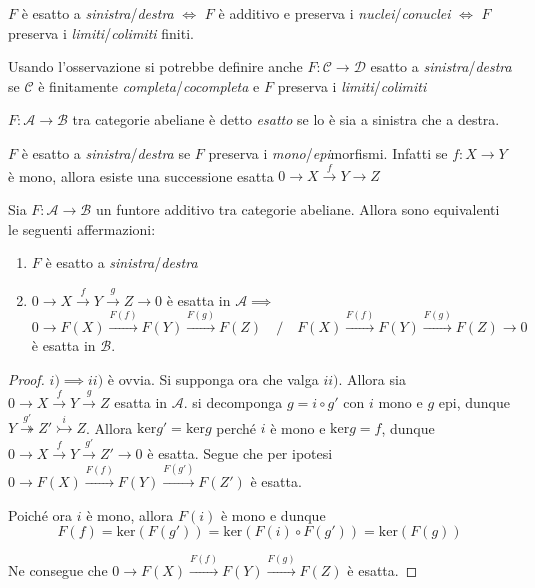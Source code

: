 \begin{remark}{}
    \(F\) è esatto a \emph{sinistra}/\emph{destra} \(\iff\) \(F\) è additivo
    e preserva i \emph{nuclei}/\emph{conuclei} \(\iff\) \(F\) preserva i
    \emph{limiti}/\emph{colimiti} finiti.
\end{remark}

Usando l'osservazione si potrebbe definire anche \(F : \mathcal{C} \to \mathcal{D}\)
esatto a \emph{sinistra}/\emph{destra} se \(\mathcal{C}\) è finitamente
\emph{completa}/\emph{cocompleta} e \(F\) preserva i
\emph{limiti}/\emph{colimiti}

\begin{definition}{}
    \(F : \mathcal{A} \to \mathcal{B}\) tra categorie abeliane è detto
    \emph{esatto} se lo è sia a sinistra che a destra.
\end{definition}

\begin{remark}{}
    \(F\) è esatto a \emph{sinistra}/\emph{destra} se \(F\) preserva i
    \emph{mono}/\emph{epi}morfismi. Infatti se \(f : X \to Y\) è mono, allora
    esiste una successione esatta \(0 \to X \overset{f}{\to } Y \to Z\) 
\end{remark}

\begin{proposition}{}\label{prop:fun_exact_iff}
    Sia \(F : \mathcal{A} \to \mathcal{B}\) un funtore additivo tra categorie
    abeliane. Allora sono equivalenti le seguenti affermazioni:
\begin{enumerate}[label = \roman*)]
    \item \(F\) è esatto a \emph{sinistra}/\emph{destra}
    \item \(0 \to X \overset{f}{\to } Y \overset{g}{\to } Z \to 0\) è esatta in
        \(\mathcal{A} \implies \) 
        \[0 \to F{(X)} \overset{F{(f)}}{\to } F{(Y)} \overset{F{(g)}}{\to} F{(Z)} \quad / \quad F{(X)} \overset{F{(f)}}{\to } F{(Y)} \overset{F{(g)}}{\to} F{(Z)} \to 0\]
        è esatta in \(\mathcal{B}\).
\end{enumerate}
\end{proposition}

\begin{proof}{}
    \(i) \implies ii)\) è ovvia. Si supponga ora che valga \(ii)\). Allora sia
    \(0 \to X \overset{f}{\to} Y \overset{g}{\to } Z\) esatta in \(\mathcal{A}\). si decomponga \(g = i \circ g'\) con \(i\) mono e \(g\) epi, dunque \(Y \overset{g'}{\twoheadrightarrow } Z'
    \overset{i}{\rightarrowtail } Z\). Allora \(\mathrm{ker}g' = \mathrm{ker}g\) perché \(i\) è mono e \(\mathrm{ker}g = f\), dunque \( 0 \to X \overset{f}{\to } Y \overset{g'}{\to } Z' \to 0\) è esatta. Segue che per ipotesi \(0 \to F{(X)} \overset{F{(f)}}{\to } F{(Y)} \overset{F{(g')}}{\to} F{(Z')}\) è esatta.

    Poiché ora \(i\) è mono, allora \(F{(i)}\) è mono e dunque \[F{(f)} = \mathrm{ker}{(F{(g')})} = \mathrm{ker}{(F{(i)} \circ F{(g')})} = \mathrm{ker}{(F{(g)})}\]

    Ne consegue che \(0 \to F{(X)} \overset{F{(f)}}{\to } F{(Y)} \overset{F{(g)}}{\to} F{(Z)}\) è esatta.
\end{proof}


